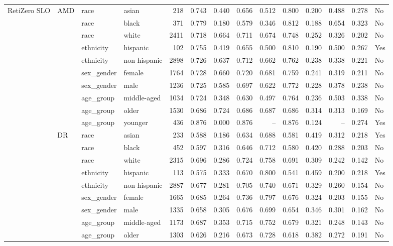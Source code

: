 \begin{longtable}{@{}lll l rrrrrrrr@{}}
RetiZero SLO & AMD & race & asian & 218 & 0.743 & 0.440 & 0.656 & 0.512 & 0.800 & 0.200 & 0.488 & 0.278 & No \\
 &  & race & black & 371 & 0.779 & 0.180 & 0.579 & 0.346 & 0.812 & 0.188 & 0.654 & 0.323 & No \\
 &  & race & white & 2411 & 0.718 & 0.664 & 0.711 & 0.674 & 0.748 & 0.252 & 0.326 & 0.202 & No \\
 &  & ethnicity & hispanic & 102 & 0.755 & 0.419 & 0.655 & 0.500 & 0.810 & 0.190 & 0.500 & 0.267 & Yes \\
 &  & ethnicity & non-hispanic & 2898 & 0.726 & 0.637 & 0.712 & 0.662 & 0.762 & 0.238 & 0.338 & 0.221 & No \\
 &  & sex\_gender & female & 1764 & 0.728 & 0.660 & 0.720 & 0.681 & 0.759 & 0.241 & 0.319 & 0.211 & No \\
 &  & sex\_gender & male & 1236 & 0.725 & 0.585 & 0.697 & 0.622 & 0.772 & 0.228 & 0.378 & 0.238 & No \\
 &  & age\_group & middle-aged & 1034 & 0.724 & 0.348 & 0.630 & 0.497 & 0.764 & 0.236 & 0.503 & 0.338 & No \\
 &  & age\_group & older & 1530 & 0.686 & 0.724 & 0.686 & 0.687 & 0.686 & 0.314 & 0.313 & 0.169 & No \\
 &  & age\_group & younger & 436 & 0.876 & 0.000 & 0.876 & -- & 0.876 & 0.124 & -- & 0.274 & Yes \\
 & DR & race & asian & 233 & 0.588 & 0.186 & 0.634 & 0.688 & 0.581 & 0.419 & 0.312 & 0.218 & Yes \\
 &  & race & black & 452 & 0.597 & 0.316 & 0.646 & 0.712 & 0.580 & 0.420 & 0.288 & 0.203 & No \\
 &  & race & white & 2315 & 0.696 & 0.286 & 0.724 & 0.758 & 0.691 & 0.309 & 0.242 & 0.142 & No \\
 &  & ethnicity & hispanic & 113 & 0.575 & 0.333 & 0.670 & 0.800 & 0.541 & 0.459 & 0.200 & 0.218 & Yes \\
 &  & ethnicity & non-hispanic & 2887 & 0.677 & 0.281 & 0.705 & 0.740 & 0.671 & 0.329 & 0.260 & 0.154 & No \\
 &  & sex\_gender & female & 1665 & 0.685 & 0.264 & 0.736 & 0.797 & 0.676 & 0.324 & 0.203 & 0.155 & No \\
 &  & sex\_gender & male & 1335 & 0.658 & 0.305 & 0.676 & 0.699 & 0.654 & 0.346 & 0.301 & 0.162 & No \\
 &  & age\_group & middle-aged & 1173 & 0.687 & 0.353 & 0.715 & 0.752 & 0.679 & 0.321 & 0.248 & 0.143 & No \\
 &  & age\_group & older & 1303 & 0.626 & 0.216 & 0.673 & 0.728 & 0.618 & 0.382 & 0.272 & 0.191 & No \\

\end{longtable}
